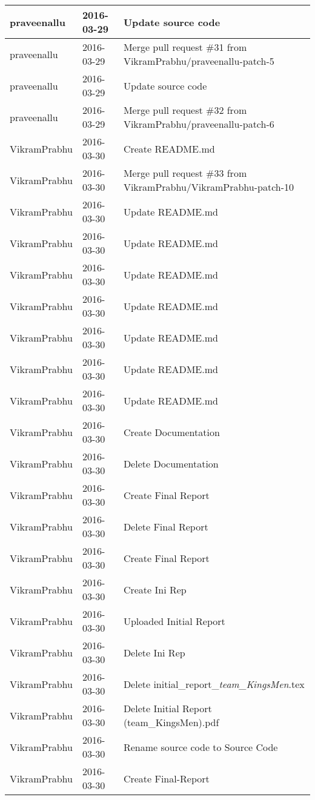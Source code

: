 \documentclass[a4paper]{article}
\begin{document}
\begin{center}
\begin{longtable}{|l|l|l|}
praveenallu & 2016-03-29 & Update source code \\ \hline
praveenallu & 2016-03-29 & Merge pull request \#31 from VikramPrabhu/praveenallu-patch-5 \\ \hline
praveenallu & 2016-03-29 & Update source code \\ \hline
praveenallu & 2016-03-29 & Merge pull request \#32 from VikramPrabhu/praveenallu-patch-6 \\ \hline
VikramPrabhu & 2016-03-30 & Create README.md \\ \hline
VikramPrabhu & 2016-03-30 & Merge pull request \#33 from VikramPrabhu/VikramPrabhu-patch-10 \\ \hline
VikramPrabhu & 2016-03-30 & Update README.md \\ \hline
VikramPrabhu & 2016-03-30 & Update README.md \\ \hline
VikramPrabhu & 2016-03-30 & Update README.md \\ \hline
VikramPrabhu & 2016-03-30 & Update README.md \\ \hline
VikramPrabhu & 2016-03-30 & Update README.md \\ \hline
VikramPrabhu & 2016-03-30 & Update README.md \\ \hline
VikramPrabhu & 2016-03-30 & Update README.md \\ \hline
VikramPrabhu & 2016-03-30 & Create Documentation \\ \hline
VikramPrabhu & 2016-03-30 & Delete Documentation \\ \hline
VikramPrabhu & 2016-03-30 & Create Final Report \\ \hline
VikramPrabhu & 2016-03-30 & Delete Final Report \\ \hline
VikramPrabhu & 2016-03-30 & Create Final Report \\ \hline
VikramPrabhu & 2016-03-30 & Create Ini Rep \\ \hline
VikramPrabhu & 2016-03-30 & Uploaded Initial Report \\ \hline
VikramPrabhu & 2016-03-30 & Delete Ini Rep \\ \hline
VikramPrabhu & 2016-03-30 & Delete initial\_report\_\emph{team\_KingsMen}.tex \\ \hline
VikramPrabhu & 2016-03-30 & Delete Initial Report (team\_KingsMen).pdf \\ \hline
VikramPrabhu & 2016-03-30 & Rename source code to Source Code \\ \hline
VikramPrabhu & 2016-03-30 & Create Final-Report \\ \hline

\end{longtable}
\end{center}
\end{document}

